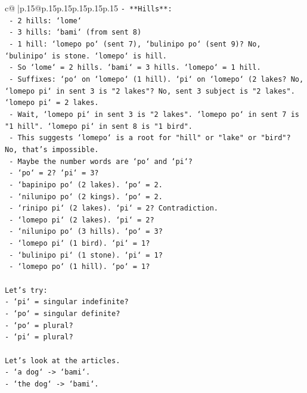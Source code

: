 \documentclass{article}
\begin{document}
{\begin{supertabular}{c@{$\;$}|p{.15\linewidth}@{}p{.15\linewidth}p{.15\linewidth}p{.15\linewidth}p{.15\linewidth}p{.15\linewidth}}
{{{\texttt{{-} **Hills**:} \\
\texttt{  {-} 2 hills: `lome`} \\
\texttt{  {-} 3 hills: `bami` (from sent 8)} \\
\texttt{  {-} 1 hill: `lomepo po` (sent 7), `bulinipo po` (sent 9)? No, `bulinipo` is stone. `lomepo` is hill.} \\
\texttt{  {-} So `lome` = 2 hills. `bami` = 3 hills. `lomepo` = 1 hill.} \\
\texttt{  {-} Suffixes: `po` on `lomepo` (1 hill). `pi` on `lomepo` (2 lakes? No, `lomepo pi` in sent 3 is "2 lakes"? No, sent 3 subject is "2 lakes". `lomepo pi` = 2 lakes.} \\
\texttt{  {-} Wait, `lomepo pi` in sent 3 is "2 lakes". `lomepo po` in sent 7 is "1 hill". `lomepo pi` in sent 8 is "1 bird".} \\
\texttt{  {-} This suggests `lomepo` is a root for "hill" or "lake" or "bird"? No, that's impossible.} \\
\texttt{  {-} Maybe the number words are `po` and `pi`?} \\
\texttt{    {-} `po` = 2? `pi` = 3?} \\
\texttt{    {-} `bapinipo po` (2 lakes). `po` = 2.} \\
\texttt{    {-} `nilunipo po` (2 kings). `po` = 2.} \\
\texttt{    {-} `rinipo pi` (2 lakes). `pi` = 2? Contradiction.} \\
\texttt{    {-} `lomepo pi` (2 lakes). `pi` = 2?} \\
\texttt{    {-} `nilunipo po` (3 hills). `po` = 3?} \\
\texttt{    {-} `lomepo pi` (1 bird). `pi` = 1?} \\
\texttt{    {-} `bulinipo pi` (1 stone). `pi` = 1?} \\
\texttt{    {-} `lomepo po` (1 hill). `po` = 1?} \\
\\ 
\texttt{Let's try:} \\
\texttt{{-} `pi` = singular indefinite?} \\
\texttt{{-} `po` = singular definite?} \\
\texttt{{-} `po` = plural?} \\
\texttt{{-} `pi` = plural?} \\
\\ 
\texttt{Let's look at the articles.} \\
\texttt{{-} `a dog` {-}> `bami`.} \\
\texttt{{-} `the dog` {-}> `bami`.} \\
}}}
\end{supertabular}}
\end{document}
